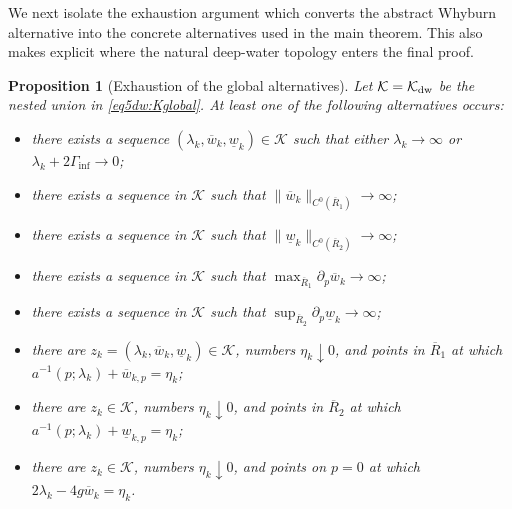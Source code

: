 \documentclass[11pt,reqno]{amsart}
\numberwithin{equation}{section}
\newtheorem{proposition}[theorem]{Proposition}
\theoremstyle{definition}
\theoremstyle{remark}
\begin{document}
We next isolate the exhaustion argument which converts the abstract
Whyburn alternative into the concrete alternatives used in the main
theorem.  This also makes explicit where the natural deep-water
topology enters the final proof.

\begin{proposition}[Exhaustion of the global alternatives]
\label{prop:section6-exhaustion}
Let $\mathcal K=\mathcal K_{\rm dw}$ be the nested union in
\eqref{eq5dw:Kglobal}.  At least one of the following alternatives
occurs:
\begin{itemize}
  \item[(1)] there exists a sequence
$(\lambda_k,\overline w_k,\underline w_k)\in\mathcal K$ such that
either $\lambda_k\to\infty$ or
$\lambda_k+2\Gamma_{\inf}\to0$;
  \item[(2)] there exists a sequence in $\mathcal K$ such that
$\|\overline w_k\|_{C^0(\overline R_1)}\to\infty$;
  \item[(3)] there exists a sequence in $\mathcal K$ such that
$\|\underline w_k\|_{C^0(\overline R_2)}\to\infty$;
  \item[(4)] there exists a sequence in $\mathcal K$ such that
$\max_{\overline R_1}\partial_p\overline w_k\to\infty$;
  \item[(5)] there exists a sequence in $\mathcal K$ such that
$\sup_{\overline R_2}\partial_p\underline w_k\to\infty$;
  \item[(6)] there are $z_k=(\lambda_k,\overline w_k,
\underline w_k)\in\mathcal K$, numbers $\eta_k\downarrow0$, and
points in $\overline R_1$ at which
$a^{-1}(p;\lambda_k)+\overline w_{k,p}=\eta_k$;
  \item[(7)] there are $z_k\in\mathcal K$, numbers
$\eta_k\downarrow0$, and points in $\overline R_2$ at which
$a^{-1}(p;\lambda_k)+\underline w_{k,p}=\eta_k$;
  \item[(8)] there are $z_k\in\mathcal K$, numbers
$\eta_k\downarrow0$, and points on $p=0$ at which
$2\lambda_k-4g\overline w_k=\eta_k$.
\end{itemize}
\end{proposition}
\end{document}

